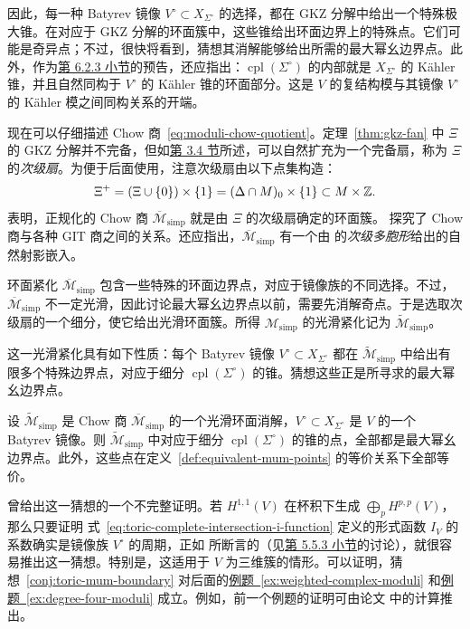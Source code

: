因此，每一种 Batyrev 镜像 $V^\circ\subset X_{\Sigma^\circ}$ 的选择，都在 GKZ 分解中给出一个特殊极大锥。在对应于 GKZ 分解的环面簇中，这些锥给出环面边界上的特殊点。它们可能是奇异点；不过，很快将看到，猜想其消解能够给出所需的最大幂幺边界点。此外，作为\hyperref[subsec:enlarged-kahler-moduli]{第 6.2.3 小节}的预告，还应指出：$\operatorname{cpl}(\Sigma^\circ)$ 的内部就是 $X_{\Sigma^\circ}$ 的 Kähler 锥，并且自然同构于 $V^\circ$ 的 Kähler 锥的环面部分。这是 $V$ 的复结构模与其镜像 $V^\circ$ 的 Kähler 模之间同构关系的开端。

现在可以仔细描述 Chow 商~\eqref{eq:moduli-chow-quotient}。定理~\ref{thm:gkz-fan} 中 $\Xi$ 的 GKZ 分解并不完备，但如\hyperref[sec:gkz-decomposition]{第 3.4 节}所述，可以自然扩充为一个完备扇，称为 $\Xi$ 的\emph{次级扇}。为便于后面使用，注意次级扇由以下点集构造：
\begin{equation}\label{eq:moduli-secondary-configuration}\index{次级扇|hyperpage}
\Xi^+=(\Xi\cup\{0\})\times\{1\}=(\Delta\cap M)_0\times\{1\}\subset M\times\mathbb Z.
\end{equation}
 表明，正规化的 Chow 商 $\overline{\mathcal M}_{\mathrm{simp}}$ 就是由 $\Xi$ 的次级扇确定的环面簇。 探究了 Chow 商与各种 GIT 商之间的关系。还应指出，$\overline{\mathcal M}_{\mathrm{simp}}$ 有一个由  的\emph{次级多胞形}给出的自然射影嵌入。

环面紧化 $\overline{\mathcal M}_{\mathrm{simp}}$ 包含一些特殊的环面边界点，对应于镜像族的不同选择。不过，$\overline{\mathcal M}_{\mathrm{simp}}$ 不一定光滑，因此讨论最大幂幺边界点以前，需要先消解奇点。于是选取次级扇的一个细分，使它给出光滑环面簇。所得 $\mathcal M_{\mathrm{simp}}$ 的光滑紧化记为 $\widetilde{\mathcal M}_{\mathrm{simp}}$。

这一光滑紧化具有如下性质：每个 Batyrev 镜像 $V^\circ\subset X_{\Sigma^\circ}$ 都在 $\widetilde{\mathcal M}_{\mathrm{simp}}$ 中给出有限多个特殊边界点，对应于细分 $\operatorname{cpl}(\Sigma^\circ)$ 的锥。猜想这些正是所寻求的最大幂幺边界点。
\begin{conjecture}\label{conj:toric-mum-boundary}
设 $\widetilde{\mathcal M}_{\mathrm{simp}}$ 是 Chow 商 $\overline{\mathcal M}_{\mathrm{simp}}$ 的一个光滑环面消解，$V^\circ\subset X_{\Sigma^\circ}$ 是 $V$ 的一个 Batyrev 镜像。则 $\widetilde{\mathcal M}_{\mathrm{simp}}$ 中对应于细分 $\operatorname{cpl}(\Sigma^\circ)$ 的锥的点，全部都是最大幂幺边界点。此外，这些点在定义~\ref{def:equivalent-mum-points} 的等价关系下全部等价。
\end{conjecture}
 曾给出这一猜想的一个不完整证明。若 $H^{1,1}(V)$ 在杯积下生成 $\bigoplus_pH^{p,p}(V)$，那么只要证明
式~\eqref{eq:toric-complete-intersection-i-function} 定义的形式函数 $I_V$ 的系数确实是镜像族 $V^\circ$ 的周期，正如  所断言的（见\hyperref[subsec:nef-gkz]{第 5.5.3 小节}的讨论），就很容易推出这一猜想。特别是，这适用于 $V$ 为三维簇的情形。可以证明，猜想~\ref{conj:toric-mum-boundary} 对后面的\hyperref[ex:weighted-complex-moduli]{例题~\ref*{ex:weighted-complex-moduli}} 和\hyperref[ex:degree-four-moduli]{例题~\ref*{ex:degree-four-moduli}} 成立。例如，前一个例题的证明可由论文  中的计算推出。

